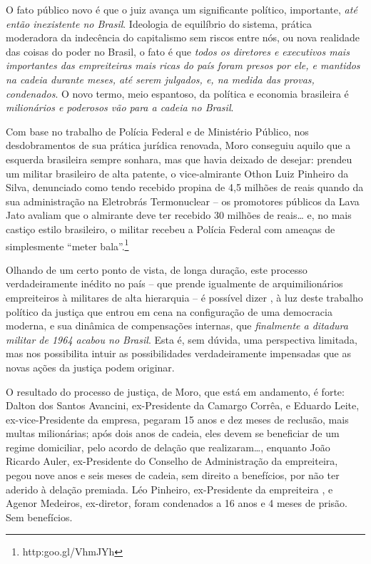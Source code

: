 O fato público novo é que o juiz avança um significante político,
importante, \emph{até então inexistente no Brasil}. Ideologia de
equilíbrio do sistema, prática moderadora da indecência do capitalismo
sem riscos entre nós, ou nova realidade das coisas do poder no Brasil, o
fato é que \emph{todos os diretores e executivos mais importantes das
empreiteiras mais ricas do país foram presos por ele, e mantidos na
cadeia durante meses, até serem julgados, e, na medida das provas,
condenados}. O novo termo, meio espantoso, da política e economia
brasileira é \emph{milionários e poderosos vão para a cadeia no Brasil}.

Com base no trabalho de Polícia Federal e de Ministério Público, nos
desdobramentos de sua prática jurídica renovada, Moro conseguiu aquilo
que a esquerda brasileira sempre sonhara, mas que havia deixado de
desejar: prendeu um militar brasileiro de alta patente, o vice-almirante
Othon Luiz Pinheiro da Silva, denunciado como tendo recebido propina de
4,5 milhões de reais quando da sua administração na Eletrobrás
Termonuclear -- os promotores públicos da Lava Jato avaliam que o
almirante deve ter recebido 30 milhões de reais… e, no mais castiço
estilo brasileiro, o militar recebeu a Polícia Federal com ameaças de
simplesmente ``meter bala''.\footnote{http:goo.gl/VhmJYh}

Olhando de um certo ponto de vista, de longa duração, este processo
verdadeiramente inédito no país -- que prende igualmente de
arquimilionários empreiteiros à militares de alta hierarquia -- é
possível dizer , à luz deste trabalho político da justiça que entrou em
cena na configuração de uma democracia moderna, e sua dinâmica de
compensações internas, que \emph{finalmente a ditadura militar de 1964
acabou no Brasil}. Esta é, sem dúvida, uma perspectiva limitada, mas nos
possibilita intuir as possibilidades verdadeiramente impensadas que as
novas ações da justiça podem originar.

O resultado do processo de justiça, de Moro, que está em andamento, é
forte: Dalton dos Santos Avancini, ex-Presidente da Camargo Corrêa, e
Eduardo Leite, ex-vice-Presidente da empresa, pegaram 15 anos e dez
meses de reclusão, mais multas milionárias; após dois anos de cadeia,
eles devem se beneficiar de um regime domiciliar, pelo acordo de delação
que realizaram…, enquanto João Ricardo Auler, ex-Presidente do
Conselho de Administração da empreiteira, pegou nove anos e seis meses
de cadeia, sem direito a benefícios, por não ter aderido à delação
premiada. Léo Pinheiro, ex-Presidente da empreiteira , e Agenor
Medeiros, ex-diretor, foram condenados a 16 anos e 4 meses de prisão.
Sem benefícios.

